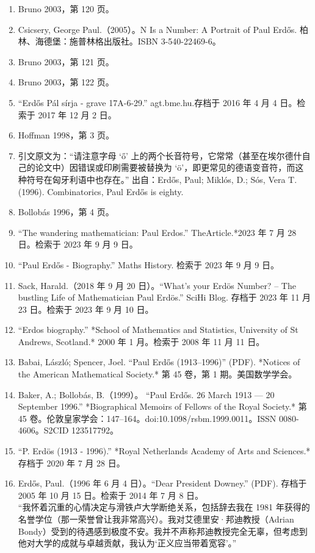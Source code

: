 \begin{enumerate}
\item Bruno 2003，第 120 页。
\item Csicsery, George Paul.（2005）。N Is a Number: A Portrait of Paul Erdős. 柏林、海德堡：施普林格出版社。ISBN 3-540-22469-6。
\item Bruno 2003，第 121 页。
\item Bruno 2003，第 122 页。
\item “Erdős Pál sírja - grave 17A-6-29.” agt.bme.hu.存档于 2016 年 4 月 4 日。检索于 2017 年 12 月 2 日。
\item Hoffman 1998，第 3 页。
\item 引文原文为：“请注意字母 ‘ő’ 上的两个长音符号，它常常（甚至在埃尔德什自己的论文中）因错误或印刷需要被替换为 ‘ö’，即更常见的德语变音符，而这种符号在匈牙利语中也存在。” 出自：Erdős, Paul; Miklós, D.; Sós, Vera T. (1996). Combinatorics, Paul Erdős is eighty.
\item Bollobás 1996，第 4 页。
\item “The wandering mathematician: Paul Erdos.” TheArticle.*2023 年 7 月 28 日。检索于 2023 年 9 月 9 日。
\item “Paul Erdős - Biography.” Maths History. 检索于 2023 年 9 月 9 日。
\item Sack, Harald.（2018 年 9 月 20 日）。“What’s your Erdös Number? – The bustling Life of Mathematician Paul Erdös.” SciHi Blog. 存档于 2023 年 11 月 23 日。检索于 2023 年 9 月 10 日。
\item “Erdos biography.” *School of Mathematics and Statistics, University of St Andrews, Scotland.* 2000 年 1 月。检索于 2008 年 11 月 11 日。
\item Babai, László; Spencer, Joel. “Paul Erdős (1913–1996)” (PDF). *Notices of the American Mathematical Society.* 第 45 卷，第 1 期。美国数学学会。
\item Baker, A.; Bollobás, B.（1999）。 “Paul Erdős. 26 March 1913 — 20 September 1996.” *Biographical Memoirs of Fellows of the Royal Society.* 第 45 卷。伦敦皇家学会：147–164。doi:10.1098/rsbm.1999.0011。ISSN 0080-4606。S2CID 123517792。
\item “P. Erdös (1913 - 1996).” *Royal Netherlands Academy of Arts and Sciences.* 存档于 2020 年 7 月 28 日。
\item Erdős, Paul.（1996 年 6 月 4 日）。“Dear President Downey.” (PDF). 存档于 2005 年 10 月 15 日。检索于 2014 年 7 月 8 日。\\
“我怀着沉重的心情决定与滑铁卢大学断绝关系，包括辞去我在 1981 年获得的名誉学位（那一荣誉曾让我非常高兴）。我对艾德里安·邦迪教授（Adrian Bondy）受到的待遇感到极度不安。我并不声称邦迪教授完全无辜，但考虑到他对大学的成就与卓越贡献，我认为‘正义应当带着宽容’。”

\end{enumerate}
